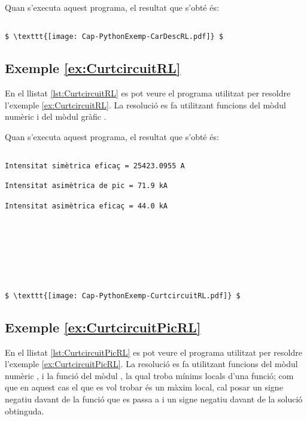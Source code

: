 Quan s'executa aquest programa, el resultat que s'obté és:
\lstset{
	language=,
	numbers=none,
	frame=none
}
\begin{lstlisting}[mathescape=true]
	
$ \texttt{[image: Cap-PythonExemp-CarDescRL.pdf]} $
\end{lstlisting}


\hypertarget{exemple:CurtcircuitRL}{\subsection{Exemple \ref*{ex:CurtcircuitRL} \CurtcircuitRL}}
En el llistat \vref{lst:CurtcircuitRL} es pot veure el programa utilitzat per resoldre l'exemple \vref{ex:CurtcircuitRL}. La resolució es fa utilitzant funcions del mòdul numèric  i del mòdul gràfic  .


Quan s'executa aquest programa, el resultat que s'obté és:
\lstset{
	language=,
	numbers=none,
	frame=none
}

\begin{lstlisting}[mathescape=true]
	
Intensitat simètrica eficaç = 25423.0955 A

Intensitat asimètrica de pic = 71.9 kA

Intensitat asimètrica eficaç = 44.0 kA








$ \texttt{[image: Cap-PythonExemp-CurtcircuitRL.pdf]} $
\end{lstlisting}


\hypertarget{exemple:CurtcircuitPicRL}{\subsection{Exemple \ref*{ex:CurtcircuitPicRL} \CurtcircuitPicRL}}
En el llistat \vref{lst:CurtcircuitPicRL} es pot veure el programa utilitzat per resoldre l'exemple \vref{ex:CurtcircuitPicRL}. La resolució es fa utilitzant funcions del mòdul numèric , i la funció  del mòdul  , la qual troba mínims locals d'una funció; com que en aquest cas  el que es vol trobar és un màxim local, cal posar un signe negatiu davant de la funció que es passa a  i un signe negatiu davant de la solució obtinguda.



